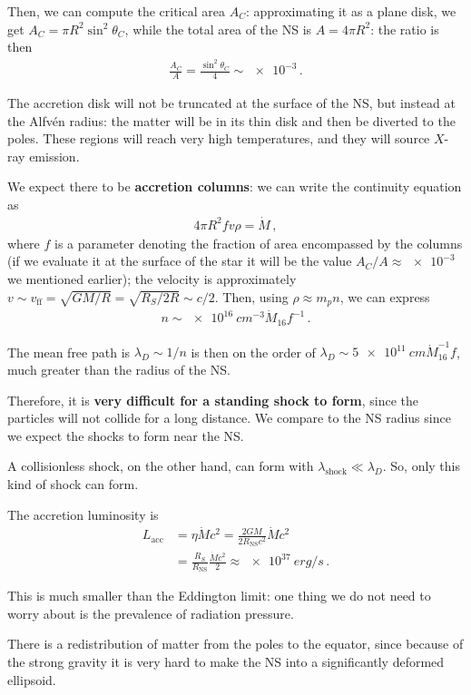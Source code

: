 \documentclass[main.tex]{subfiles}
\begin{document}
Then, we can compute the critical area \(A_C\): approximating it as a plane disk, we get \(A_C = \pi R^2 \sin^2 \theta _C\), while the total area of the NS is \(A = 4 \pi R^2\): the ratio is then 
%
\begin{align}
\frac{A_C}{A} = \frac{\sin^2 \theta _C}{4} \sim \num{e-3}
\,.
\end{align}

The accretion disk will not be truncated at the surface of the NS, but instead at the Alfvén radius: the matter will be in its thin disk and then be diverted to the poles. 
These regions will reach very high temperatures, and they will source \(X\)-ray emission.

We expect there to be \textbf{accretion columns}: we can write the continuity equation as 
%
\begin{align}
4 \pi R^2 f v \rho = \dot{M}
\,,
\end{align}
%
where \(f\) is a parameter denoting the fraction of area encompassed by the columns (if we evaluate it at the surface of the star it will be the value \(A_C / A \approx \num{e-3}\) we mentioned earlier); the velocity is approximately \(v \sim v _{\text{ff}} = \sqrt{GM/R} = \sqrt{R_S / 2R} \sim c/2\). 
Then, using \(\rho \approx m_p n\), we can express 
%
\begin{align}
n \sim \SI{e16}{cm^{-3}} \dot{M}_{16} f^{-1}
\,.
\end{align}

The mean free path is \(\lambda _D \sim 1/n\) is then on the order of \(\lambda _D \sim \SI{5e11}{cm} \dot{M}_{16}^{-1} f\), much greater than the radius of the NS. 

Therefore, it is \textbf{very difficult for a standing shock to form}, since the particles will not collide for a long distance. 
We compare to the NS radius since we expect the shocks to form near the NS. 

A collisionless shock, on the other hand, can form with \(\lambda _{\text{shock}} \ll \lambda _D\). 
So, only this kind of shock can form. 

The accretion luminosity is 
%
\begin{align}
L _{\text{acc}} &= \eta \dot{M} c^2 = \frac{2GM}{2 R _{\text{NS}}c^2} \dot{M} c^2  \\
&= \frac{R_S}{R _{\text{NS}}} \frac{\dot{M}c^2}{2} \approx \SI{e37}{erg/s}
\,.
\end{align}

This is much smaller than the Eddington limit: one thing we do not need to worry about is the prevalence of radiation pressure. 

There is a redistribution of matter from the poles to the equator, since because of the strong gravity it is very hard to make the NS into a significantly deformed ellipsoid.
\end{document}
